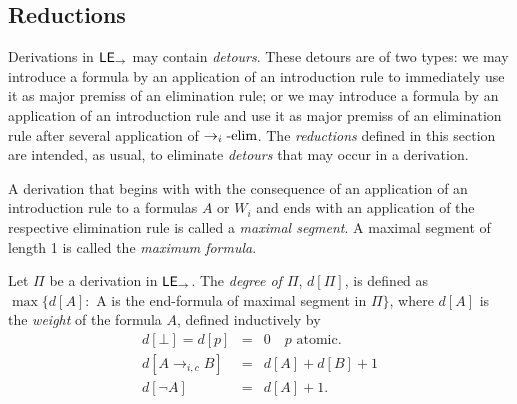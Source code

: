 \subsection{Reductions}
Derivations in $\mathsf{LE}_{\to}$ may contain \emph{detours}. These detours are of two types: we may introduce a formula by an application of an introduction rule to immediately use it as major premiss of an elimination rule; or we may introduce a formula by an application of an introduction rule and use it as major premiss of an elimination rule after several application of $\rightarrow_i\mbox{-elim}$. The \emph{reductions} defined in this section are intended, as usual, to eliminate \emph{detours} that may occur in a derivation.


\begin{definition}
A derivation that begins with with the consequence of an application of an introduction rule to a formulas $A$ or $W_{i}$ and ends with an application of the respective elimination rule is called a {\em maximal segment}. A maximal segment of length 1 is called the {\em maximum formula}.
\end{definition}

\begin{definition}
Let $\Pi$ be a derivation in $\mathsf{LE}_{\to}$. The {\em degree of $\Pi$}, $d[\Pi ]$, is defined as $\max\{d[A]:$ A is the end-formula of maximal segment in $\Pi \}$, where $d[A]$ is the {\em weight} of the formula $A$, defined inductively by
$$
\begin{array}{lcl}
d[\bot]=d[p] &=& 0 \quad p\mbox{ atomic.}\\
d[A \to_{i,c} B] &=& d[A] + d[B] + 1 \\
d[\neg A] &=& d[A] +1.
\end{array}
$$
\end{definition}


